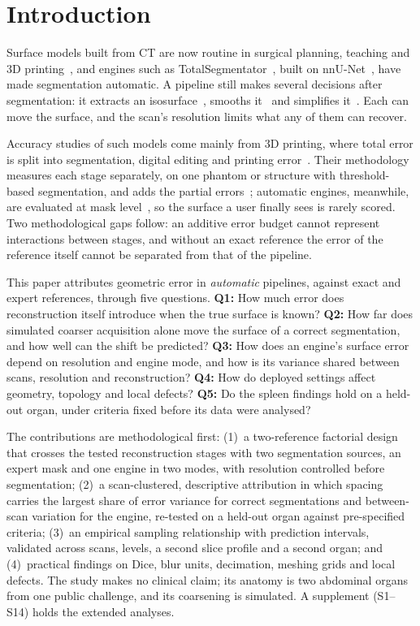 \documentclass[conference]{IEEEtran}
\begin{document}
\section{Introduction}
Surface models built from CT are now routine in surgical planning, teaching and 3D printing~\cite{schulze2024qa}, and engines such as TotalSegmentator~\cite{wasserthal2023totalsegmentator}, built on nnU-Net~\cite{isensee2021nnunet}, have made segmentation automatic. A pipeline still makes several decisions after segmentation: it extracts an isosurface~\cite{lorensen1987marching,lewiner2003marching}, smooths it~\cite{taubin1995signal} and simplifies it~\cite{schroeder1992decimation}. Each can move the surface, and the scan's resolution limits what any of them can recover.

Accuracy studies of such models come mainly from 3D printing, where total error is split into segmentation, digital editing and printing error~\cite{schulze2024qa}. Their methodology measures each stage separately, on one phantom or structure with threshold-based segmentation, and adds the partial errors~\cite{juergensen2024phantom}; automatic engines, meanwhile, are evaluated at mask level~\cite{antonelli2022msd,wasserthal2023totalsegmentator}, so the surface a user finally sees is rarely scored. Two methodological gaps follow: an additive error budget cannot represent interactions between stages, and without an exact reference the error of the reference itself cannot be separated from that of the pipeline.

This paper attributes geometric error in \emph{automatic} pipelines, against exact and expert references, through five questions. \textbf{Q1:} How much error does reconstruction itself introduce when the true surface is known? \textbf{Q2:} How far does simulated coarser acquisition alone move the surface of a correct segmentation, and how well can the shift be predicted? \textbf{Q3:} How does an engine's surface error depend on resolution and engine mode, and how is its variance shared between scans, resolution and reconstruction? \textbf{Q4:} How do deployed settings affect geometry, topology and local defects? \textbf{Q5:} Do the spleen findings hold on a held-out organ, under criteria fixed before its data were analysed?

The contributions are methodological first: (1)~a two-reference factorial design that crosses the tested reconstruction stages with two segmentation sources, an expert mask and one engine in two modes, with resolution controlled before segmentation; (2)~a scan-clustered, descriptive attribution in which spacing carries the largest share of error variance for correct segmentations and between-scan variation for the engine, re-tested on a held-out organ against pre-specified criteria; (3)~an empirical sampling relationship with prediction intervals, validated across scans, levels, a second slice profile and a second organ; and (4)~practical findings on Dice, blur units, decimation, meshing grids and local defects. The study makes no clinical claim; its anatomy is two abdominal organs from one public challenge, and its coarsening is simulated. A supplement (S1--S14) holds the extended analyses.
\end{document}
